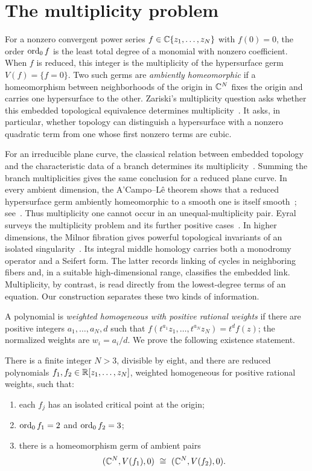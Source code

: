 \section{The multiplicity problem}
\label{sec:introduction}

For a nonzero convergent power series
$f\in\mathbb C\{z_1,\ldots,z_N\}$ with $f(0)=0$, the order $\operatorname{ord}_0f$ is
the least total degree of a monomial with nonzero coefficient. When $f$
is reduced, this integer is the multiplicity of the hypersurface germ
$V(f)=\{f=0\}$. Two such germs are \emph{ambiently homeomorphic} if a
homeomorphism between neighborhoods of the origin in $\mathbb C^N$ fixes the
origin and carries one hypersurface to the other. Zariski's multiplicity
question asks whether this embedded topological equivalence determines
multiplicity~\cite{Zariski1971}. It asks, in particular, whether topology
can distinguish a hypersurface with a nonzero quadratic term from one
whose first nonzero terms are cubic.

For an irreducible plane curve, the classical relation between embedded
topology and the characteristic data of a branch determines its
multiplicity~\cite{Zariski1932}. Summing the branch multiplicities gives
the same conclusion for a reduced plane curve. In every ambient dimension,
the A'Campo--L\^e theorem shows that a reduced hypersurface germ ambiently
homeomorphic to a smooth one is itself smooth~\cite{ACampo1973,Le1973};
see~\cite[Theorem~2.2]{Sampaio2025Milnor}. Thus multiplicity one cannot
occur in an unequal-multiplicity pair. Eyral surveys the multiplicity
problem and its further positive cases~\cite{Eyral2007}.
In higher dimensions, the Milnor
fibration gives powerful topological invariants of an isolated
singularity~\cite{Milnor1968}. Its integral middle homology carries both
a monodromy operator and a Seifert form. The latter records linking of
cycles in neighboring fibers and, in a suitable high-dimensional range,
classifies the embedded link. Multiplicity, by contrast, is read directly
from the lowest-degree terms of an equation. Our construction separates
these two kinds of information.

A polynomial is \emph{weighted homogeneous with positive rational
weights} if there are positive integers $a_1,\ldots,a_N,d$ such that
$f(t^{a_1}z_1,\ldots,t^{a_N}z_N)=t^d f(z)$; the normalized weights are
$w_i=a_i/d$. We prove the following existence statement.

\begin{theorem}\label{thm:main}
There is a finite integer $N>3$, divisible by eight, and there are reduced
polynomials $f_1,f_2\in\mathbb R[z_1,\ldots,z_N]$, weighted homogeneous for
positive rational weights, such that:
\begin{enumerate}[label=\textup{(\roman*)}]
\item each $f_j$ has an isolated critical point at the origin;
\item $\operatorname{ord}_0f_1=2$ and $\operatorname{ord}_0f_2=3$;
\item there is a homeomorphism germ of ambient pairs
\[
 (\C^N,V(f_1),0)\ \cong\ (\C^N,V(f_2),0).
\]
\end{enumerate}
\end{theorem}

